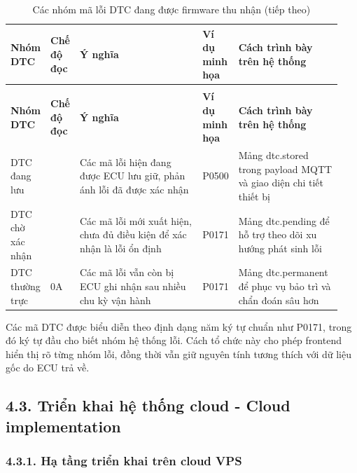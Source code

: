 \documentclass[a4paper]{extarticle}
\newcommand{\thesisterm}[1]{{\rmfamily #1}}
\newcommand{\thesissettableid}[2]{%
  \renewcommand{\thetable}{#1}%
  \renewcommand{\theHtable}{#2}%
}
\begin{document}
{\thesissettableid{4.6}{condensed-bang-4-6-cac-nhom-ma-loi-dtc-dang-duoc-firmware-thu-nhan}
\def\LTcaptype{table}
\begin{longtable}{|L{0.083\linewidth}|L{0.065\linewidth}|L{0.396\linewidth}|L{0.074\linewidth}|L{0.326\linewidth}|}
\caption{Các nhóm mã lỗi DTC đang được firmware thu nhận}\label{tab:condensed-bang-4-6-cac-nhom-ma-loi-dtc-dang-duoc-firmware-thu-nhan}\\
\hline
\textbf{Nhóm DTC} & \textbf{Chế độ đọc} & \textbf{Ý nghĩa} & \textbf{Ví dụ minh họa} & \textbf{Cách trình bày trên hệ thống} \\
\hline
\endfirsthead
\caption[]{Các nhóm mã lỗi DTC đang được firmware thu nhận (tiếp theo)}\\
\hline
\textbf{Nhóm DTC} & \textbf{Chế độ đọc} & \textbf{Ý nghĩa} & \textbf{Ví dụ minh họa} & \textbf{Cách trình bày trên hệ thống} \\
\hline
\endhead
\endfoot
\endlastfoot
DTC đang lưu & \thesisterm{03} & Các mã lỗi hiện đang được ECU lưu giữ, phản ánh lỗi đã được xác nhận & \thesisterm{P0500} & Mảng \thesisterm{dtc.stored} trong payload MQTT và giao diện chi tiết thiết bị \\\hline
DTC chờ xác nhận & \thesisterm{07} & Các mã lỗi mới xuất hiện, chưa đủ điều kiện để xác nhận là lỗi ổn định & \thesisterm{P0171} & Mảng \thesisterm{dtc.pending} để hỗ trợ theo dõi xu hướng phát sinh lỗi \\\hline
DTC thường trực & \thesisterm{0A} & Các mã lỗi vẫn còn bị ECU ghi nhận sau nhiều chu kỳ vận hành & \thesisterm{P0171} & Mảng \thesisterm{dtc.permanent} để phục vụ bảo trì và chẩn đoán sâu hơn \\\hline
\end{longtable}
}

Các mã DTC được biểu diễn theo định dạng năm ký tự chuẩn như \thesisterm{P0171}, trong đó ký
tự đầu cho biết nhóm hệ thống lỗi. Cách tổ chức này cho phép frontend hiển thị rõ
từng nhóm lỗi, đồng thời vẫn giữ nguyên tính tương thích với dữ liệu gốc do ECU trả
về.

\subsection{4.3. Triển khai hệ thống cloud - Cloud implementation}\label{triux1ec3n-khai-hux1ec7-thux1ed1ng-cloud---cloud-implementation}

\subsubsection{4.3.1. Hạ tầng triển khai trên cloud VPS}\label{hux1ea1-tux1ea7ng-triux1ec3n-khai-truxean-cloud-vps}
\end{document}
